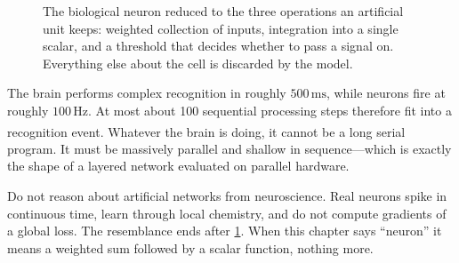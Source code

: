 \begin{figure}[htbp]
\centering
{}
\caption{The biological neuron reduced to the three operations an artificial
unit keeps: weighted collection of inputs, integration into a single scalar,
and a threshold that decides whether to pass a signal on. Everything else about
the cell is discarded by the model.}
\label{fig:dl-biological-neuron}
\end{figure}

\begin{v3aside}
The brain performs complex recognition in roughly $500\,\text{ms}$, while
neurons fire at roughly $100\,\text{Hz}$. At most about 100 sequential
processing steps therefore fit into a recognition
event\textsuperscript{\cite[][pp.~29--31]{Kriesel2007NeuralNetworks}}. Whatever
the brain is doing, it cannot be a long serial program. It must be massively
parallel and shallow in sequence---which is exactly the shape of a layered
network evaluated on parallel hardware.
\end{v3aside}

\begin{cautionbox}
Do not reason about artificial networks from neuroscience. Real neurons spike
in continuous time, learn through local chemistry, and do not compute gradients
of a global loss. The resemblance ends after \cref{fig:dl-biological-neuron}.
When this chapter says ``neuron'' it means a weighted sum followed by a scalar
function, nothing more.
\end{cautionbox}

